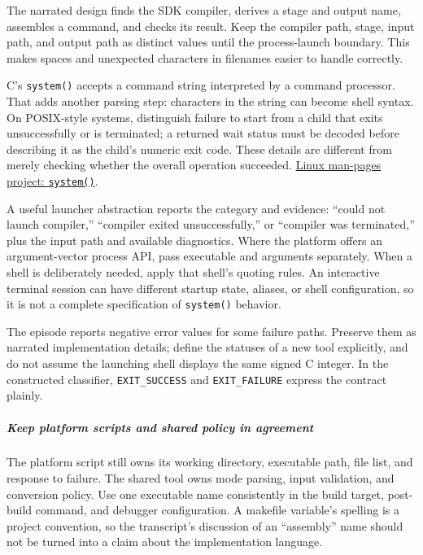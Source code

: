 The narrated design finds the SDK compiler, derives a stage and output name, assembles a command, and checks its result. Keep the compiler path, stage, input path, and output path as distinct values until the process-launch boundary. This makes spaces and unexpected characters in filenames easier to handle correctly.

C's \texttt{system()} accepts a command string interpreted by a command processor. That adds another parsing step: characters in the string can become shell syntax. On POSIX-style systems, distinguish failure to start from a child that exits unsuccessfully or is terminated; a returned wait status must be decoded before describing it as the child's numeric exit code. These details are different from merely checking whether the overall operation succeeded. \href{https://man7.org/linux/man-pages/man3/system.3.html}{Linux man-pages project: \texttt{system()}}.

A useful launcher abstraction reports the category and evidence: ``could not launch compiler,'' ``compiler exited unsuccessfully,'' or ``compiler was terminated,'' plus the input path and available diagnostics. Where the platform offers an argument-vector process API, pass executable and arguments separately. When a shell is deliberately needed, apply that shell's quoting rules. An interactive terminal session can have different startup state, aliases, or shell configuration, so it is not a complete specification of \texttt{system()} behavior.

The episode reports negative error values for some failure paths. Preserve them as narrated implementation details; define the statuses of a new tool explicitly, and do not assume the launching shell displays the same signed C integer. In the constructed classifier, \texttt{EXIT\_SUCCESS} and \texttt{EXIT\_FAILURE} express the contract plainly.

\subparagraph{Keep platform scripts and shared policy in agreement}\label{keep-platform-scripts-and-shared-policy-in-agreement}

The platform script still owns its working directory, executable path, file list, and response to failure. The shared tool owns mode parsing, input validation, and conversion policy. Use one executable name consistently in the build target, post-build command, and debugger configuration. A makefile variable's spelling is a project convention, so the transcript's discussion of an ``assembly'' name should not be turned into a claim about the implementation language.

